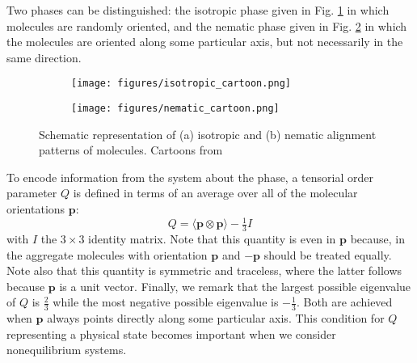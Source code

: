 \documentclass[reqno]{article}
\begin{document}
  Two phases can be distinguished: the isotropic phase given in
  Fig. \ref{fig:isotropic-cartoon} in which molecules are randomly oriented, and
  the nematic phase given in Fig. \ref{fig:nematic-cartoon} in which the
  molecules are oriented along some particular axis, but not necessarily in the
  same direction.
  \begin{figure}[h] 
    \centering
    \begin{subfigure}{0.4\textwidth}
      \texttt{[image: figures/isotropic\_cartoon.png]}
      \caption{}
      \label{fig:isotropic-cartoon}
    \end{subfigure}
    \hfill
    \begin{subfigure}{0.4\textwidth}
      \texttt{[image: figures/nematic\_cartoon.png]}
      \caption{}
      \label{fig:nematic-cartoon}
    \end{subfigure}
    \caption{Schematic representation of (a) isotropic and (b) nematic alignment
      patterns of molecules. Cartoons from ~\cite{selinger_introduction_2016}}
    \label{fig:alignment-cartoons}
  \end{figure}
  To encode information from the system about the phase, a tensorial
  order parameter $Q$ is defined in terms of an average over all of the molecular
  orientations $\mathbf{p}$:
  \begin{equation} \label{eq:Q-def}
    Q = \langle \mathbf{p} \otimes \mathbf{p} \rangle - \tfrac13 I
  \end{equation}
  with $I$ the $3\times 3$ identity matrix.
  Note that this quantity is even in $\mathbf{p}$ because, in the aggregate
  molecules with orientation $\mathbf{p}$ and $-\mathbf{p}$ should be treated
  equally.
  Note also that this quantity is symmetric and traceless, where the latter
  follows because $\mathbf{p}$ is a unit vector.
  Finally, we remark that the largest possible eigenvalue of $Q$ is $\frac23$
  while the most negative possible eigenvalue is $-\frac13$.
  Both are achieved when $\mathbf{p}$ always points directly along some
  particular axis.
  This condition for $Q$ representing a physical state becomes important when we
  consider nonequilibrium systems.
\end{document}
